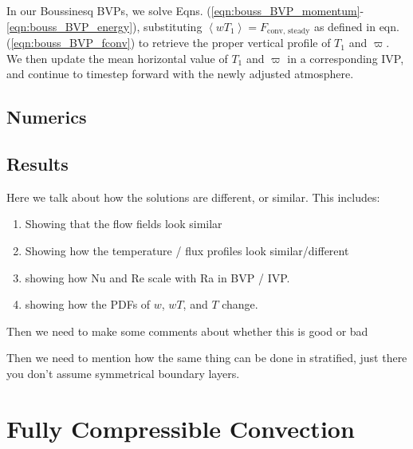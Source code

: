 \documentclass[aps, pre, onecolumn, nofootinbib, notitlepage, groupedaddress, amsfonts, amssymb, amsmath, longbibliography]{revtex4-1}
\newcommand{\angles}[1]{\ensuremath{\left\langle #1 \right\rangle}}
\begin{document}
In our Boussinesq BVPs, we solve Eqns. (\ref{eqn:bouss_BVP_momentum}-\ref{eqn:bouss_BVP_energy}),
substituting $\angles{wT_1} = F_{\text{conv, steady}}$ as defined in eqn. (\ref{eqn:bouss_BVP_fconv})
to retrieve the proper vertical profile of $T_1$ and $\varpi$.  We then update the mean horizontal value
of $T_1$ and $\varpi$ in a corresponding IVP, and continue to timestep forward with the newly adjusted
atmosphere.

\subsection{Numerics}

\subsection{Results}
Here we talk about how the solutions are different, or similar.  This includes:
\begin{enumerate}
\item Showing that the flow fields look similar
\item Showing how the temperature / flux profiles look similar/different
\item showing how Nu and Re scale with Ra in BVP / IVP.
\item showing how the PDFs of $w$, $wT$, and $T$ change.
\end{enumerate}

Then we need to make some comments about whether this is good or bad

Then we need to mention how the same thing can be done in stratified, just there you don't
assume symmetrical boundary layers.



\section{Fully Compressible Convection}
\end{document}
